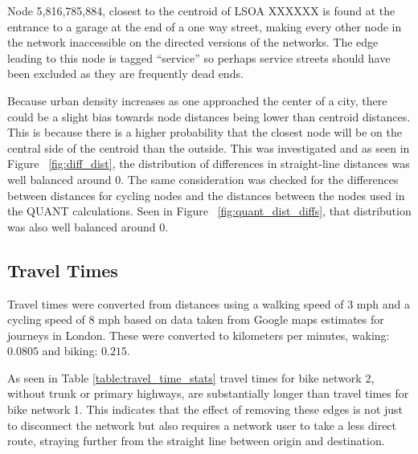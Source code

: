 Node 5,816,785,884, closest to the centroid of LSOA XXXXXX is found at the entrance to a garage at the end of a one way street, making every other node in the network inaccessible on the directed versions of the networks. The edge leading to this node is tagged ``service'' so perhaps service streets should have been excluded as they are frequently dead ends. 

Because urban density increases as one approached the center of a city, there could be a slight bias towards node distances being lower than centroid distances. This is because there is a higher probability that the closest node will be on the central side of the centroid than the outside. This was investigated and as seen in Figure ~\ref{fig:diff_dist}, the distribution of differences in straight-line distances was well balanced around 0. The same consideration was checked for the differences between distances for cycling nodes and the distances between the nodes used in the QUANT calculations. Seen in Figure ~\ref{fig:quant_dist_diffs}, that distribution was also well balanced around 0. 

\subsection{Travel Times}

Travel times were converted from distances using a walking speed of 3 mph and a cycling speed of 8 mph based on data taken from Google maps estimates for journeys in London. These were converted to kilometers per minutes, waking: $0.0805$ and biking: $0.215$. 

As seen in Table \ref{table:travel_time_stats} travel times for bike network 2, without trunk or primary highways, are substantially longer than travel times for bike network 1. This indicates that the effect of removing these edges is not just to disconnect the network but also requires a network user to take a less direct route, straying further from the straight line between origin and destination. 

